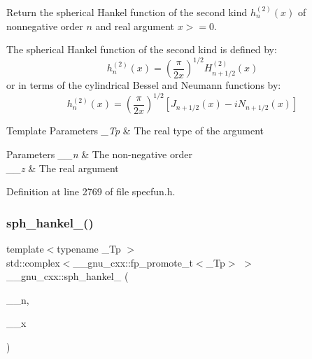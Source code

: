 Return the spherical Hankel function of the second kind $ h^{(2)}_n(x)$ of nonnegative order $ n $ and real argument $ x >= 0 $.

The spherical Hankel function of the second kind is defined by\+: \[ h^{(2)}_n(x) = \left(\frac{\pi}{2x} \right) ^{1/2} H^{(2)}_{n+1/2}(x) \] or in terms of the cylindrical Bessel and Neumann functions by\+: \[ h^{(2)}_n(x) = \left(\frac{\pi}{2x} \right) ^{1/2} \left[ J_{n+1/2}(x) - iN_{n+1/2}(x) \right] \]


\begin{DoxyTemplParams}{Template Parameters}
{\em \+\_\+\+Tp} & The real type of the argument \\
\hline
\end{DoxyTemplParams}

\begin{DoxyParams}{Parameters}
{\em \+\_\+\+\_\+n} & The non-\/negative order \\
\hline
{\em \+\_\+\+\_\+z} & The real argument \\
\hline
\end{DoxyParams}


Definition at line 2769 of file specfun.\+h.

\mbox{\label{group__gnu__math__spec__func_ga0e7d9b5a93ab1d1040040f0ef44590de}} 
\subsubsection{\texorpdfstring{sph\+\_\+hankel\+\_()}{sph\_hankel\_2()}\hspace{0.1cm}{\footnotesize\ttfamily [2/2]}}
{\footnotesize\ttfamily template$<$typename \+\_\+\+Tp $>$ \\
std\+::complex$<$\+\_\+\+\_\+gnu\+\_\+cxx\+::fp\+\_\+promote\+\_\+t$<$\+\_\+\+Tp$>$ $>$ \+\_\+\+\_\+gnu\+\_\+cxx\+::sph\+\_\+hankel\+\_ (\begin{DoxyParamCaption}\item[{unsigned int}]{\+\_\+\+\_\+n,  }\item[{std\+::complex$<$ \+\_\+\+Tp $>$}]{\+\_\+\+\_\+x }\end{DoxyParamCaption})\hspace{0.3cm}{\ttfamily [inline]}}

